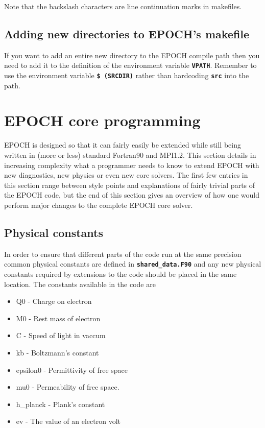 \documentclass[12pt]{article}
\newcommand{\inlinecode}[1]{{\color{warwickred} \bf\texttt{#1}}}
\newcommand{\EPOCH}{{\color{warwickdark}\fontfamily{phv}\selectfont EPOCH} }
\begin{document}
Note that the backslash characters are line continuation marks in makefiles.

\subsection{Adding new directories to EPOCH's makefile}
If you want to add an entire new directory to the \EPOCH compile path then you
need to add it to the definition of the environment variable
\inlinecode{VPATH}. Remember to use the environment variable \inlinecode{\$
(SRCDIR)} rather than hardcoding \inlinecode{src} into the path.

\section{\EPOCH core programming}
\EPOCH is designed so that it can fairly easily be extended while still being
written in (more or less) standard Fortran90 and MPI1.2. This section details
in increasing complexity what a programmer needs to know to extend \EPOCH with
new diagnostics, new physics or even new core solvers. The first few entries
in this section range between style points and explanations of fairly trivial
parts of the \EPOCH code, but the end of this section gives an overview of how
one would perform major changes to the complete \EPOCH core solver.

\subsection{Physical constants}
In order to ensure that different parts of the code run at the same precision
common physical constants are defined in \inlinecode{shared\_data.F90} and any
new physical constants required by extensions to the code should be placed in
the same location. The constants available in the code are
\begin{itemize}
\item Q0 - Charge on electron
\item M0 - Rest mass of electron
\item C - Speed of light in vaccum
\item kb - Boltzmann's constant
\item epsilon0 - Permittivity of free space
\item mu0 - Permeability of free space.
\item h\_planck - Plank's constant
\item ev - The value of an electron volt
\end{itemize}
\end{document}
